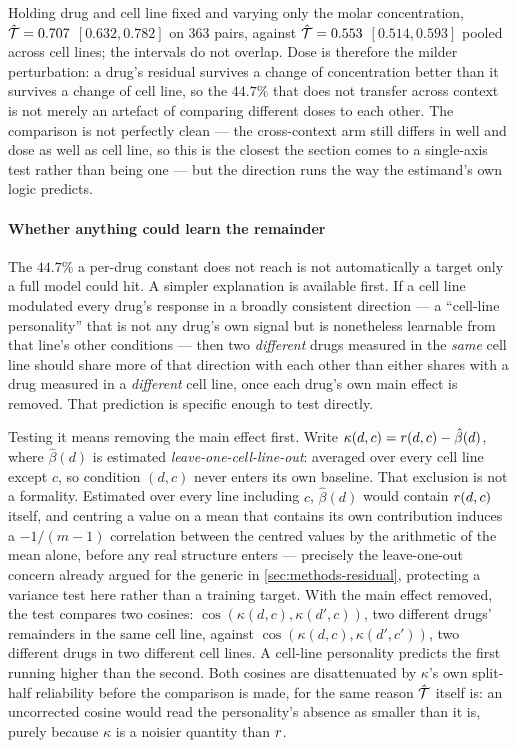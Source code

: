 Holding drug and cell line fixed and varying only the molar concentration,
$\hat{\mathcal{T}} = 0.707$ $[0.632, 0.782]$ on $\num{363}$ pairs, against
$\hat{\mathcal{T}} = 0.553$ $[0.514, 0.593]$ pooled across cell lines; the intervals
do not overlap. Dose is therefore the milder perturbation: a drug's residual
survives a change of concentration better than it survives a change of cell
line, so the $44.7\%$ that does not transfer across context is not merely an
artefact of comparing different doses to each other. The comparison is not
perfectly clean --- the cross-context arm still differs in well and dose as well
as cell line, so this is the closest the section comes to a single-axis test rather than being one --- but the direction runs the way the estimand's own logic
predicts.


 
\paragraph{Whether anything could learn the remainder} The $44.7\%$ a per-drug
constant does not reach is not automatically a target only a full model could
hit. A simpler explanation is available first. If a cell line modulated every
drug's response in a broadly consistent direction --- a ``cell-line
personality'' that is not any drug's own signal but is nonetheless learnable
from that line's other conditions --- then two \emph{different} drugs measured
in the \emph{same} cell line should share more of that direction with each
other than either shares with a drug measured in a \emph{different} cell line,
once each drug's own main effect is removed. That prediction is specific enough
to test directly.

Testing it means removing the main effect first. Write
$\kappa(d,c) = r(d,c) - \hat{\beta}(d)$, where $\hat\beta(d)$ is estimated
\emph{leave-one-cell-line-out}: averaged over every cell line except $c$, so
condition $(d,c)$ never enters its own baseline. That exclusion is not a
formality. Estimated over every line including $c$, $\hat\beta(d)$ would
contain $r(d,c)$ itself, and centring a value on a mean that contains its
own contribution induces a $-1/(m-1)$ correlation between the centred values by
the arithmetic of the mean alone, before any real structure enters ---
precisely the leave-one-out concern already argued for the generic in
\cref{sec:methods-residual}, protecting a variance test here rather than a
training target. With the main effect removed, the test compares two cosines:
$\cos(\kappa(d,c), \kappa(d',c))$, two different drugs' remainders in the same
cell line, against $\cos(\kappa(d,c), \kappa(d',c'))$, two different drugs in
two different cell lines. A cell-line personality predicts the first running
higher than the second. Both cosines are disattenuated by $\kappa$'s own
split-half reliability before the comparison is made, for the same reason
$\hat{\mathcal{T}}$ itself is: an uncorrected cosine would read the personality's
absence as smaller than it is, purely because $\kappa$ is a noisier quantity
than $r$.

